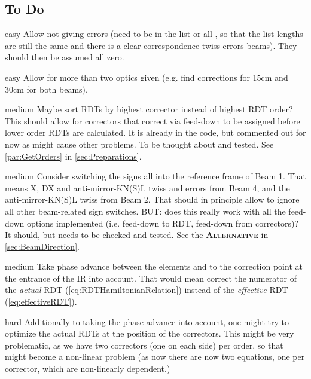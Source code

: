 \subsection{To Do}
\label{sec:Todo}
\begin{important}
 \item[\color{AtlasGreen}easy] Allow not giving errors 
   (need to be  in the list or all , 
   so that the list lengths are still the same and there is a
   clear correspondence twiss-errors-beams).
   They should then be assumed all zero.
 \item[\color{AtlasGreen}easy] Allow for more than two optics given
   (e.g. find corrections for 15cm and 30cm for both beams).
 \item[\color{AtlasOrange}medium] 
   Maybe sort RDTs by highest corrector instead of highest RDT order?
   This should allow for correctors that correct via feed-down
   to be assigned before lower order RDTs are calculated.
   It is already in the code, but commented out for now as
   might cause other problems. To be thought about and tested.
   See \cref{par:GetOrders} in \cref{sec:Preparations}.
 \item[\color{AtlasOrange}medium] 
   Consider switching the signs all into the reference frame of Beam 1.
   That means X, DX and anti-mirror-KN(S)L twiss and errors from Beam 4,
   and the anti-mirror-KN(S)L twiss from Beam 2.
   That should in principle allow to ignore all other beam-related sign switches.
   BUT: does this really work with all the feed-down options implemented
   (i.e. feed-down to RDT, feed-down from correctors)?
   It should, but needs to be checked and tested.
   See the \hyperlink{Alternative:SwitchBeamSigns}{\textcolor{AtlasGreen}{\textsc{\bfseries Alternative}}} in \cref{sec:BeamDirection}.
 \item[\color{AtlasOrange}medium]
   Take phase advance between the elements and to the correction point at the entrance of the IR into account.
   That would mean correct the numerator of the \textit{actual} RDT (\cref{eq:RDTHamiltonianRelation}) instead 
   of the \textit{effective} RDT (\cref{eq:effectiveRDT}).
 \item[\color{CernRed}hard]
   Additionally to taking the phase-advance into account, one might try to optimize the actual RDTs at the position of the correctors.
   This might be very problematic, as we have two correctors (one on each side)
   per order, so that might become a non-linear problem (as now there
   are now two equations, one per corrector, which are non-linearly dependent.)
\end{important}
